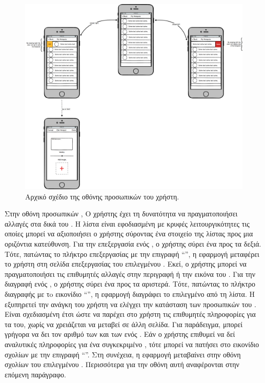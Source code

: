 \begin{figure}[H]
    \centering
    \includegraphics[scale=0.22]{figures/my-hotspots.png}
    \caption{Αρχικό σχέδιο της οθόνης προσωπικών  του χρήστη.}
    \label{myhotspotsmockup}
\end{figure}

Στην οθόνη προσωπικών , Ο χρήστης έχει τη δυνατότητα να πραγματοποιήσει αλλαγές στα δικά του . Η λίστα είναι εφοδιασμένη με κρυφές λειτουργικότητες τις οποίες μπορεί να αξιοποιήσει ο χρήστης σύροντας ένα στοιχείο της λίστας προς μια οριζόντια κατεύθυνση. Για την επεξεργασία ενός , ο χρήστης σύρει ένα  προς τα δεξιά. Τότε, πατώντας το πλήκτρο επεξεργασίας με την επιγραφή ``\textit{}'', η εφαρμογή μεταφέρει το χρήστη στη σελίδα επεξεργασίας του επιλεγμένου . Εκεί, ο χρήστης μπορεί να πραγματοποιήσει τις επιθυμητές αλλαγές στην περιγραφή ή την εικόνα του . Για την διαγραφή ενός , ο χρήστης σύρει ένα  προς τα αριστερά. Τότε, πατώντας το πλήκτρο διαγραφής με τo εικονίδιο ``\textit{}'', η εφαρμογή διαγράφει το επιλεγμένο  από τη λίστα. \newline
\indent
Η  εξυπηρετεί την ανάγκη του χρήστη να ελέγχει την κατάσταση των προσωπικών του . Είναι σχεδιασμένη έτσι ώστε να παρέχει στο χρήστη τις επιθυμητές πληροφορίες για τα  του, χωρίς να χρειάζεται να μεταβεί σε άλλη σελίδα. Για παράδειγμα, μπορεί γρήγορα να δει τον αριθμό των  και των  ενός . Εάν ο χρήστης επιθυμεί να δεί αναλυτικές πληροφορίες για ένα συγκεκριμένο , τότε μπορεί να πατήσει στο εικονίδιο σχολίων με την επιγραφή ``\textit{}''. Στη συνέχεια, η εφαρμογή μεταβαίνει στην οθόνη σχολίων  του επιλεγμένου . Περισσότερα για την οθόνη αυτή αναφέρονται στην επόμενη παράγραφο.

